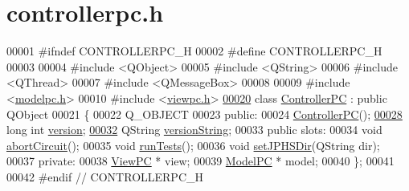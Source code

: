 \hypertarget{controllerpc_8h_source}{}\section{controllerpc.\+h}

\begin{DoxyCode}
00001 \textcolor{preprocessor}{#ifndef CONTROLLERPC\_H}
00002 \textcolor{preprocessor}{#define CONTROLLERPC\_H}
00003 
00004 \textcolor{preprocessor}{#include <QObject>}
00005 \textcolor{preprocessor}{#include <QString>}
00006 \textcolor{preprocessor}{#include <QThread>}
00007 \textcolor{preprocessor}{#include <QMessageBox>}
00008 
00009 \textcolor{preprocessor}{#include <\hyperlink{modelpc_8h}{modelpc.h}>}
00010 \textcolor{preprocessor}{#include <\hyperlink{viewpc_8h}{viewpc.h}>}
\hypertarget{controllerpc_8h_source.tex_l00020}{}\hyperlink{class_controller_p_c}{00020} \textcolor{keyword}{class }\hyperlink{class_controller_p_c}{ControllerPC} : \textcolor{keyword}{public} QObject
00021 \{
00022     Q\_OBJECT
00023 \textcolor{keyword}{public}:
00024     \hyperlink{class_controller_p_c_afa6c92d67bf3b6531c42385fc5938003}{ControllerPC}();
\hypertarget{controllerpc_8h_source.tex_l00028}{}\hyperlink{class_controller_p_c_a9eb43c34237d66751a6411e55cf5f55e}{00028}     \textcolor{keywordtype}{long} \textcolor{keywordtype}{int} \hyperlink{class_controller_p_c_a9eb43c34237d66751a6411e55cf5f55e}{version};
\hypertarget{controllerpc_8h_source.tex_l00032}{}\hyperlink{class_controller_p_c_a0e63cca37d6ce2e660f3380400c2c5f3}{00032}     QString \hyperlink{class_controller_p_c_a0e63cca37d6ce2e660f3380400c2c5f3}{versionString};
00033 \textcolor{keyword}{public} slots:
00034     \textcolor{keywordtype}{void} \hyperlink{class_controller_p_c_a8814989f7be1214e06b2e720889066b0}{abortCircuit}();
00035     \textcolor{keywordtype}{void} \hyperlink{class_controller_p_c_aaa59fc90e1ef731eee4560ec87e43707}{runTests}();
00036     \textcolor{keywordtype}{void} \hyperlink{class_controller_p_c_ac00d29685a7e5b780c01eb438e10f96d}{setJPHSDir}(QString dir);
00037 \textcolor{keyword}{private}:
00038     \hyperlink{class_view_p_c}{ViewPC} * view;
00039     \hyperlink{class_model_p_c}{ModelPC} * model;
00040 \};
00041 
00042 \textcolor{preprocessor}{#endif // CONTROLLERPC\_H}
\end{DoxyCode}
